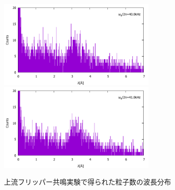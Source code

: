 \begin{figure}[h]
\includegraphics[height=4.3cm]{resonance/results/Flipper1_RawCounts_400kHz.pdf}\\
\includegraphics[height=4.3cm]{resonance/results/Flipper1_RawCounts_410kHz.pdf}
\caption{上流フリッパー共鳴実験で得られた粒子数の波長分布}\label{Resonance_fig_Flipper1_RawCounts}
\end{figure}

